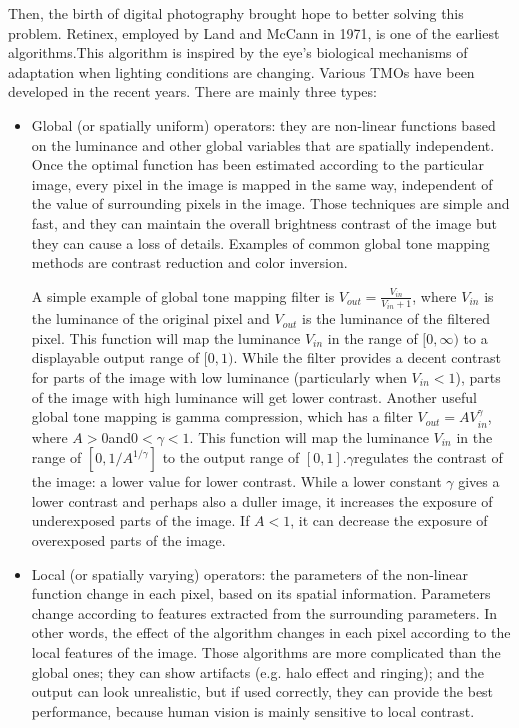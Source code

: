 \documentclass[10pt,twocolumn,letterpaper]{article}
\begin{document}
Then, the birth of digital photography brought hope to better solving this problem. Retinex, employed by Land and McCann in 1971, is one of the earliest algorithms\cite{adams1981print}.This algorithm is inspired by the eye's biological mechanisms of adaptation when lighting conditions are changing. Various TMOs have been developed in the recent years. There are mainly three types:
\begin{itemize}
\item Global (or spatially uniform) operators: they are non-linear functions based on the luminance and other global variables that are spatially independent. Once the optimal function has been estimated according to the particular image, every pixel in the image is mapped in the same way, independent of the value of surrounding pixels in the image\cite{qiu2006tone}. Those techniques are simple and fast, and they can maintain the overall brightness contrast of the image but they can cause a loss of details. Examples of common global tone mapping methods are contrast reduction and color inversion.

A simple example of global tone mapping filter is $V_{out} = \frac{V_{in}}{V_{in} + 1}$, where $V_{in}$ is the luminance of the original pixel and $V_{out}$ is the luminance of the filtered pixel\cite{reinhard2002photographic}. This function will map the luminance $V_{in}$ in the range of $\lbrack0,\infty)$ to a displayable output range of $\lbrack0,1)$. While the filter provides a decent contrast for parts of the image with low luminance (particularly when $V_{in} < 1$), parts of the image with high luminance will get lower contrast. Another useful global tone mapping is gamma compression, which has a filter $V_{out} = AV_{in}^\gamma$, where $A>0$and$0<\gamma<1$. This function will map the luminance $V_{in}$ in the range of $[0,1/A^{1/\gamma}]$ to the output range of $[0,1]$.$\gamma$regulates the contrast of the image: a lower value for lower contrast. While a lower constant $\gamma$ gives a lower contrast and perhaps also a duller image, it increases the exposure of underexposed parts of the image. If $A<1$, it can decrease the exposure of overexposed parts of the image.


\item Local (or spatially varying) operators: the parameters of the non-linear function change in each pixel, based on its spatial information. Parameters change according to features extracted from the surrounding parameters. In other words, the effect of the algorithm changes in each pixel according to the local features of the image. Those algorithms are more complicated than the global ones; they can show artifacts (e.g. halo effect and ringing); and the output can look unrealistic, but if used correctly, they can provide the best performance, because human vision is mainly sensitive to local contrast.


\end{itemize}
\end{document}
